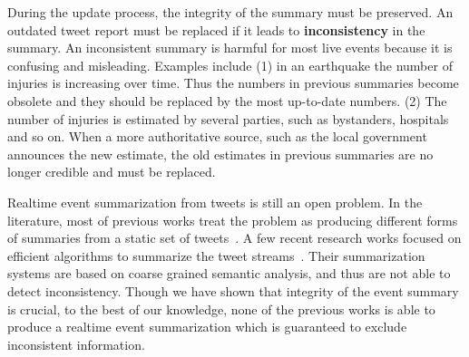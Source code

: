 \documentclass[runningheads]{llncs}
\begin{document}
During the update process, the integrity of the summary must be preserved.  An outdated tweet report must be replaced if it leads to \textbf{inconsistency} in the summary. An inconsistent summary is harmful for most live events because it is confusing and misleading. Examples include (1) in an earthquake the number of injuries is increasing over time. Thus the numbers in previous summaries become obsolete and they should be replaced by the most up-to-date numbers. (2) The number of injuries is  estimated by several parties, such as  bystanders, hospitals and so on. When a more authoritative source, such as the local government announces the new estimate, the old estimates in previous summaries are no longer credible and must be replaced.

Realtime event summarization from tweets is still an open problem. In the literature, most of previous works treat the problem as producing different forms of summaries from a static set of tweets~\cite{Takamura2011Summarizing,Lin2012Generating,Rudra2015Extracting,Liu2016LEDS,Gillani2017Post}. A few recent research works focused on efficient algorithms to summarize the tweet streams~\cite{Shou2013Sumblr,Zubiaga2012Towards}. Their summarization systems are based on coarse grained semantic analysis, and thus are not able to detect inconsistency. Though we have shown that integrity of the event summary is crucial, to the best of our knowledge, none of the previous works is able to produce a realtime event summarization which is guaranteed to exclude inconsistent information.
\end{document}
